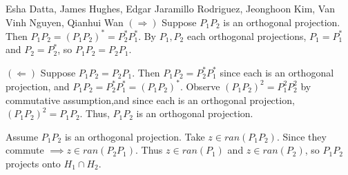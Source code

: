

\begin{solution}{Esha Datta, James Hughes, Edgar Jaramillo Rodriguez, Jeonghoon Kim, Van Vinh Nguyen, Qianhui Wan}
        $(\Rightarrow)$
        Suppose $P_1P_2$ is an orthogonal projection.
        Then $P_1P_2=(P_1P_2)^*=P_2^*P_1^*$.
        By $P_1,P_2$ each orthogonal projections, $P_1=P_1^*$ and $P_2=P_2^*$, so $P_1P_2=P_2P_1$. 

        $(\Leftarrow)$ 
        Suppose $P_1P_2=P_2P_1$.
        Then $P_1P_2=P_2^*P_1^*$ since each is an orthogonal projection, and $P_1P_2=P_2^*P_1^*=(P_1P_2)^*$.
        Observe $(P_1P_2)^2=P_1^2P_2^2$ by commutative assumption,and since each is an orthogonal projection, $(P_1P_2)^2=P_1P_2$.
        Thus, $P_1P_2$ is an orthogonal projection. 

        Assume $P_1P_2$ is an orthogonal projection.
        Take $z\in ran(P_1P_2)$.
        Since they commute $\implies z\in ran(P_2P_1)$.
        Thus $z\in ran(P_1)$ and $z\in ran(P_2)$, so $P_1P_2$ projects onto $H_1 \cap H_2$.
\end{solution}

